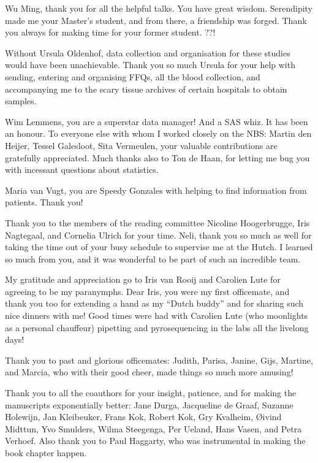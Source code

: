 \noindent Wu Ming, thank you for all the helpful talks. You have great wisdom. Serendipity made me your Master's student, and from there, a friendship was forged. Thank you always for making time for your former student. ??!

\noindent Without Ursula Oldenhof, data collection and organisation for these studies would have been unachievable. Thank you so much Ursula for your help with sending, entering and organising FFQs, all the blood collection, and accompanying me to the scary tissue archives of certain hospitals to obtain samples.

\noindent Wim Lemmens, you are a superstar data manager! And a SAS whiz. It has been an honour. To everyone else with whom I worked closely on the NBS: Martin den Heijer, Tessel Galesloot, Sita Vermeulen, your valuable contributions are gratefully appreciated. Much thanks also to Ton de Haan, for letting me bug you with incessant questions about statistics.

\noindent Maria van Vugt, you are Speedy Gonzales with helping to find information from patients. Thank you!

\noindent Thank you to the members of the reading committee Nicoline Hoogerbrugge, Iris Nagtegaal, and Cornelia Ulrich for your time. Neli, thank you so much as well for taking the time out of your busy schedule to supervise me at the Hutch. I learned so much from you, and it was wonderful to be part of such an incredible team.

\noindent My gratitude and appreciation go to Iris van Rooij and Carolien Lute for agreeing to be my paranymphs. Dear Iris, you were my first officemate, and thank you too for extending a hand as my ``Dutch buddy'' and for sharing such nice dinners with me! Good times were had with Carolien Lute (who moonlights as a personal chauffeur) pipetting and pyrosequencing in the labs all the livelong days!

\noindent Thank you to past and glorious officemates: Judith, Parisa, Janine, Gijs, Martine, and Marcia, who with their good cheer, made things so much more amusing!

\noindent Thank you to all the coauthors for your insight, patience, and for making the manuscripts exponentially better: Jane Durga, Jacqueline de Graaf, Suzanne Holewijn, Jan Kleibeuker, Frans Kok, Robert Kok, Gry Kvalheim, {\O}ivind Midttun, Yvo Smulders, Wilma Steegenga, Per Ueland, Hans Vasen, and Petra Verhoef. Also thank you to Paul Haggarty, who was instrumental in making the book chapter happen.

